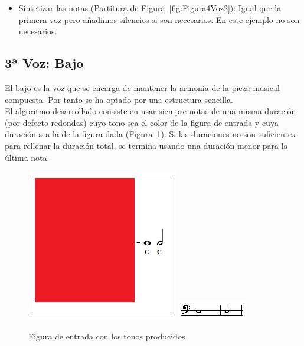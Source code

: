 \begin{itemize}
	\item Sintetizar las notas (Partitura de Figura~\ref{fig:Figura4Voz2}): Igual que la primera voz pero añadimos silencios si son necesarios. En este ejemplo no son necesarios.

\end{itemize}


\subsection{3ª Voz: Bajo}

El bajo es la voz que se encarga de mantener la armonía de la pieza musical compuesta. Por tanto se ha optado por una estructura sencilla. \\

El algoritmo desarrollado consiste en usar siempre notas de una misma duración (por defecto redondas) cuyo tono sea el color de la figura de entrada y cuya duración sea la de la figura dada (Figura~\ref{fig:Figura1Voz3}). Si las duraciones no son suficientes para rellenar la duración total, se termina usando una duración menor para la última nota. \\

		\begin{figure}[htbp]
		\centering
		\hspace*{0.0in}
		\includegraphics[scale=1]{graphics/simpletest2-F2F3.png}
		\includegraphics[scale=1]{graphics/simpletest2-BASSpartitura.png}
		\caption{Figura de entrada con los tonos producidos}
		\label{fig:Figura1Voz3}
		\end{figure}

